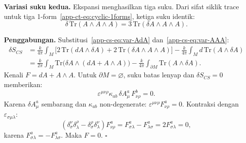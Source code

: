 \noindent\textbf{Variasi suku kedua.} Ekspansi menghasilkan tiga suku. Dari sifat siklik trace untuk tiga 1-form~\eqref{app-ct-eq:cyclic-1forms}, ketiga suku identik:
\begin{equation}\label{app-cs-eq:var-AAA}
    \delta\,\mathrm{Tr}(A \wedge A \wedge A) = 3\,\mathrm{Tr}(\delta A \wedge A \wedge A).
\end{equation}
 
\noindent\textbf{Penggabungan.} Substitusi~\eqref{app-cs-eq:var-AdA} dan~\eqref{app-cs-eq:var-AAA}:
\begin{align}
    \delta S_{CS}
    &= \frac{k}{4\pi}\int_M \big[2\,\mathrm{Tr}(dA \wedge \delta A) + 2\,\mathrm{Tr}(\delta A \wedge A \wedge A)\big] - \frac{k}{4\pi}\int_M d\,\mathrm{Tr}(A \wedge \delta A) \nonumber\\
    &= \frac{k}{2\pi}\int_M \mathrm{Tr}\big(\delta A \wedge (dA + A \wedge A)\big) - \frac{k}{4\pi}\int_{\partial M}\mathrm{Tr}(A \wedge \delta A).
\end{align}
Kenali $F = dA + A \wedge A$. Untuk $\partial M = \varnothing$, suku batas lenyap dan $\delta S_{CS} = 0$ memberikan:
\begin{equation}
    \varepsilon^{\mu\nu\rho}\kappa_{ab}\,\delta A^a_\mu\,F^b_{\nu\rho} = 0.
\end{equation}
Karena $\delta A^a_\mu$ sembarang dan $\kappa_{ab}$ non-degenerate: $\varepsilon^{\mu\nu\rho}F^a_{\nu\rho} = 0$. Kontraksi dengan $\varepsilon_{\sigma\mu\lambda}$:
\begin{equation}
    (\delta^\nu_\sigma\delta^\rho_\lambda - \delta^\rho_\sigma\delta^\nu_\lambda)F^a_{\nu\rho} = F^a_{\sigma\lambda} - F^a_{\lambda\sigma} = 2F^a_{\sigma\lambda} = 0,
\end{equation}
karena $F^a_{\sigma\lambda} = -F^a_{\lambda\sigma}$. Maka $F = 0$. $\square$
